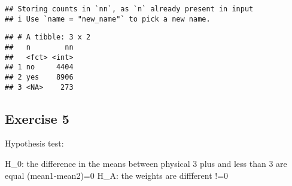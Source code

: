 \documentclass[
]{article}
\newenvironment{Shaded}{\begin{snugshade}}{\end{snugshade}}
\newcommand{\CommentTok}[1]{\textcolor[rgb]{0.56,0.35,0.01}{\textit{#1}}}
\newcommand{\DataTypeTok}[1]{\textcolor[rgb]{0.13,0.29,0.53}{#1}}
\newcommand{\DecValTok}[1]{\textcolor[rgb]{0.00,0.00,0.81}{#1}}
\newcommand{\KeywordTok}[1]{\textcolor[rgb]{0.13,0.29,0.53}{\textbf{#1}}}
\newcommand{\NormalTok}[1]{#1}
\newcommand{\OperatorTok}[1]{\textcolor[rgb]{0.81,0.36,0.00}{\textbf{#1}}}
\newcommand{\StringTok}[1]{\textcolor[rgb]{0.31,0.60,0.02}{#1}}
\begin{document}
\begin{Shaded}
\end{Shaded}

\begin{verbatim}
## Storing counts in `nn`, as `n` already present in input
## i Use `name = "new_name"` to pick a new name.
\end{verbatim}

\begin{verbatim}
## # A tibble: 3 x 2
##   n        nn
##   <fct> <int>
## 1 no     4404
## 2 yes    8906
## 3 <NA>    273
\end{verbatim}

\hypertarget{exercise-5}{%
\subsection{Exercise 5}\label{exercise-5}}

Hypothesis test:

H\_0: the difference in the means between physical 3 plus and less than
3 are equal (mean1-mean2)=0 H\_A: the weights are diffferent !=0

\begin{Shaded}
\end{Shaded}
\end{document}
